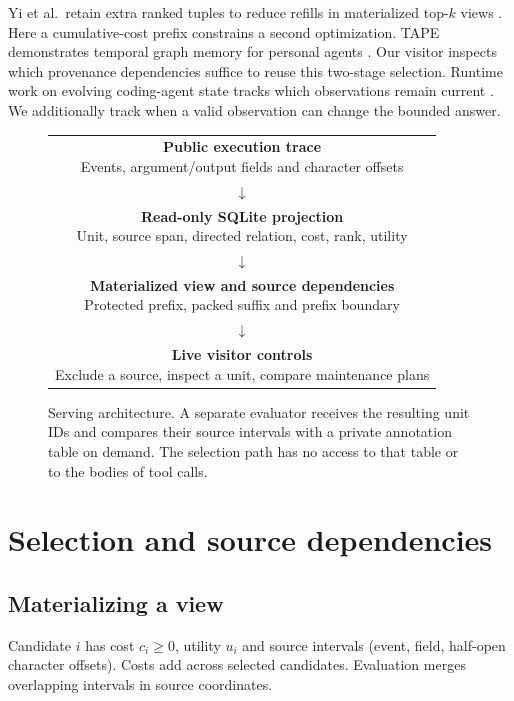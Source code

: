 \documentclass[conference]{IEEEtran}
\begin{document}
Yi et al.\ retain extra ranked tuples to reduce refills in materialized top-$k$ views \cite{topk}. Here a cumulative-cost prefix constrains a second optimization. TAPE demonstrates temporal graph memory for personal agents \cite{tape}. Our visitor inspects which provenance dependencies suffice to reuse this two-stage selection. Runtime work on evolving coding-agent state tracks which observations remain current \cite{execledger}. We additionally track when a valid observation can change the bounded answer.

\begin{figure}[t]
\centering
\setlength{\fboxsep}{4pt}
\begin{tabular}{@{}c@{}}
\fcolorbox{forest}{white}{\parbox{.88\columnwidth}{\centering \textbf{Public execution trace}\\Events, argument/output fields and character offsets}}\\
$\downarrow$\\
\fcolorbox{forest}{white}{\parbox{.88\columnwidth}{\centering \textbf{Read-only SQLite projection}\\Unit, source span, directed relation, cost, rank, utility}}\\
$\downarrow$\\
\fcolorbox{forest}{white}{\parbox{.88\columnwidth}{\centering \textbf{Materialized view and source dependencies}\\Protected prefix, packed suffix and prefix boundary}}\\
$\downarrow$\\
\fcolorbox{forest}{white}{\parbox{.88\columnwidth}{\centering \textbf{Live visitor controls}\\Exclude a source, inspect a unit, compare maintenance plans}}\\
\end{tabular}
\caption{Serving architecture. A separate evaluator receives the resulting unit IDs and compares their source intervals with a private annotation table on demand. The selection path has no access to that table or to the bodies of tool calls.}
\label{fig:system}
\end{figure}

\section{Selection and source dependencies}

\subsection{Materializing a view}
Candidate $i$ has cost $c_i\geq0$, utility $u_i$ and source intervals (event, field, half-open character offsets). Costs add across selected candidates. Evaluation merges overlapping intervals in source coordinates.
\end{document}
